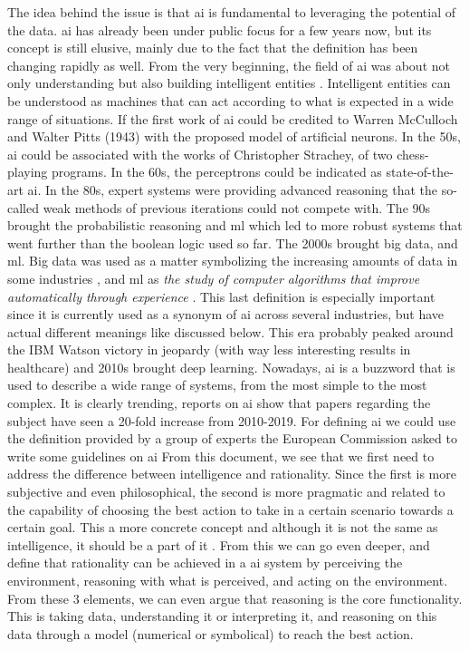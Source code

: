 The idea behind the issue is that \ac{ai} is fundamental to leveraging the potential of the data. \ac{ai} has already been under public focus for a few years now, but its concept is still elusive, mainly due to the fact that the definition has been changing rapidly as well.
From the very beginning, the field of \ac{ai} was about not only understanding but also building intelligent entities \cite{DBLP:books/aw/RN2020}.  Intelligent entities can be understood as machines that can act according to what is expected in a wide range of situations.
If the first work of \ac{ai} could be credited to Warren McCulloch and Walter Pitts (1943) with the proposed model of artificial neurons. In the 50s, \ac{ai} could be associated with the works of Christopher Strachey, of two chess-playing programs.
In the 60s, the perceptrons could be indicated as state-of-the-art \ac{ai}. In the 80s, expert systems were providing advanced reasoning that the so-called weak methods of previous iterations could not compete with.
The 90s brought the probabilistic reasoning and \ac{ml} which led to more robust systems that went further than the boolean logic used so far. The 2000s brought big data, and \ac{ml}. Big data was used as a matter symbolizing the increasing amounts of data in some industries \cite{dashBigDataHealthcare2019}, and \ac{ml} as \textit{ the study of computer algorithms that improve automatically through experience} \cite{mitchell1997machine}. This last definition is especially important since it is currently used as a synonym of \ac{ai} across several industries, but have actual different meanings like discussed below. This era probably peaked around the IBM Watson victory in jeopardy (with way less interesting results in healthcare) and 2010s brought deep learning. 
Nowadays, \ac{ai} is a buzzword that is used to describe a wide range of systems, from the most simple to the most complex. It is clearly trending, reports on \ac{ai} show that papers regarding the subject have seen a 20-fold increase from 2010-2019.
For defining \ac{ai} we could use the definition provided by a group of experts the European Commission asked to write some guidelines on \ac{ai} \cite{DefinitionAIMain2019}
From this document, we see that we first need to address the difference between intelligence and rationality. Since the first is more subjective and even philosophical, the second is more pragmatic and related to the capability of choosing the best action to take in a certain scenario towards a certain goal. This a more concrete concept and although it is not the same as intelligence, it should be a part of it \cite{DefinitionAIMain2019,DBLP:books/aw/RN2020}.
From this we can go even deeper, and define that rationality can be achieved in a \ac{ai} system by perceiving the environment, reasoning with what is perceived, and acting on the environment. From these 3 elements, we can even argue that reasoning is the core functionality. This is taking data, understanding it or interpreting it, and reasoning on this data through a model (numerical or symbolical) to reach the best action.

